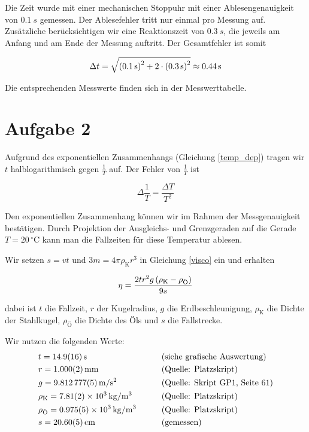 \documentclass[a4paper,german,12pt,smallheadings]{scrartcl}
\begin{document}
Die Zeit wurde mit einer mechanischen Stoppuhr mit einer Ablesengenauigkeit von
$ \SI{0.1}{s}$ gemessen. Der Ablesefehler tritt nur einmal pro Messung auf.
Zusätzliche berücksichtigen wir eine Reaktionszeit von $\SI{0.3}{s}$, die
jeweils am Anfang und am Ende der Messung auftritt. Der Gesamtfehler ist somit

\begin{equation}
  \Delta t = \sqrt{\del{\SI{0.1}{s}}^2 + 2 \cdot \del{\SI{0.3}{s}}^2} \approx \SI{0.44}{s}
\end{equation}

Die entsprechenden Messwerte finden sich in der Messwerttabelle.


\section*{Aufgabe 2}


Aufgrund des exponentiellen Zusammenhangs (Gleichung \ref{temp_dep}) tragen wir
$t$ halblogarithmisch gegen $\frac{1}{T}$ auf. Der Fehler von $\frac{1}{T}$ ist

\begin{equation}
  \Delta \frac{1}{T} = \frac{\Delta T}{T^2}
\end{equation}

Den exponentiellen Zusammenhang können wir im Rahmen der Messgenauigkeit
bestätigen. Durch Projektion der Ausgleichs- und Grenzgeraden auf die Gerade $T
= 20\,^{\circ} \mathrm{C}$ kann man die Fallzeiten für diese Temperatur
ablesen.

Wir setzen $s = vt$ und $3m = 4 \pi \rho_\text{K} r^3$ in Gleichung \ref{visco}
ein und erhalten

\begin{equation}
  \eta = \frac{2 t r^2 g \del{\rho_\text{K} - \rho_\text{Ö}}}{9 s}
  \label{visco2}
\end{equation}

dabei ist $t$ die Fallzeit, $r$ der Kugelradius, $g$ die Erdbeschleunigung,
$\rho_\text{K}$ die Dichte der Stahlkugel, $\rho_\text{Ö}$ die Dichte des Öls
und $s$ die Fallstrecke.

Wir nutzen die folgenden Werte:
\begin{align*}
  &t = \SI{14.9+-1.6}{s}     && \qquad \text{(siehe grafische Auswertung)} \\
  &r = \SI{1.000+-0.002}{mm} && \qquad \text{(Quelle: Platzskript)} \\
  &g = \SI{9.812777+-0.000005}{m/s^2} && \qquad \text{(Quelle: Skript GP1, Seite 61)} \\
  &\rho_\text{K} = \SI{7.81+-0.02e3}{kg/m^3} && \qquad \text{(Quelle: Platzskript)} \\
  &\rho_\text{Ö} = \SI{0.975+-0.005e3}{kg/m^3} && \qquad \text{(Quelle: Platzskript)} \\
  &s = \SI{20.6+-0.05}{cm} && \qquad \text{(gemessen)}
\end{align*}
\end{document}
